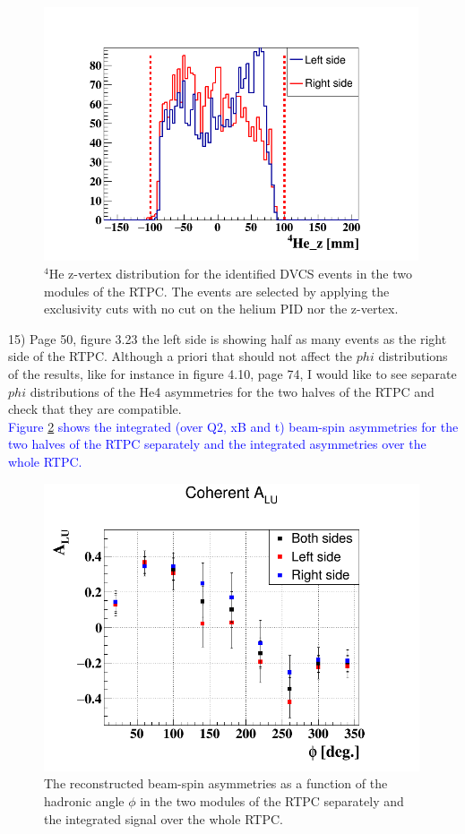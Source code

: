 \begin{figure}[tbp]
\centering
\includegraphics[height=7.5cm]{fig/dvcs_z_vertex.png}
\caption{$^{4}$He z-vertex distribution for the identified DVCS events in the 
two modules of the RTPC. The events are selected by applying the exclusivity 
cuts with no cut on the helium PID nor the z-vertex.}
\label{fig:coh_z_vertex}
 \end{figure}

15) Page 50, figure 3.23 the left side is showing half as many events as the 
right side of the RTPC. Although a priori that should not affect the $phi$ 
distributions of the results, like for instance in figure 4.10, page 74, I 
would like to see separate $phi$ distributions of the He4 asymmetries for the two 
halves of the RTPC and check that they are compatible.\\
\textcolor{blue}{Figure \ref{fig:coherent_alu_sides} shows the integrated (over 
Q2, xB and t) beam-spin asymmetries for the two halves of the RTPC separately 
and the integrated asymmetries over the whole RTPC.}\\

\begin{figure}[tbp]
\centering
\includegraphics[height=8.5cm]{fig/BSA_Coherent_sides.png}
\caption{The reconstructed beam-spin asymmetries as a function of the hadronic 
angle $\phi$ in the two modules of the RTPC separately and the integrated 
signal over the whole RTPC.}
\label{fig:coherent_alu_sides}
 \end{figure}


